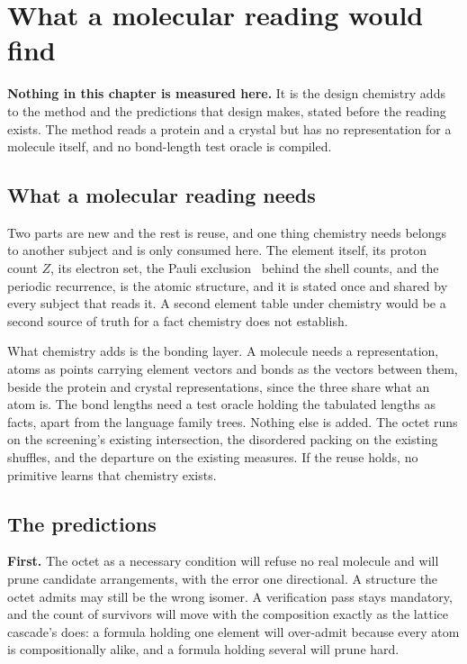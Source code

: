 \chapter{What a molecular reading would find}

\textbf{Nothing in this chapter is measured here.} It is the design chemistry adds to the method and
the predictions that design makes, stated before the reading exists. The method reads a protein and
a crystal but has no representation for a molecule itself, and no bond-length test oracle is
compiled.

\section{What a molecular reading needs}

Two parts are new and the rest is reuse, and one thing chemistry needs belongs to another subject and
is only consumed here. The element itself, its proton count \(Z\), its electron set, the Pauli
exclusion~\cite{src:Pauli-1925} behind the shell counts, and the periodic recurrence, is the atomic
structure, and it is stated once and shared by every subject that reads it. A second element table
under chemistry would be a second source of truth for a fact chemistry does not establish.

What chemistry adds is the bonding layer. A molecule needs a representation, atoms as points carrying
element vectors and bonds as the vectors between them, beside the protein and crystal
representations, since the three share what an atom is. The bond lengths need a test oracle holding
the tabulated lengths as facts, apart from the language family trees. Nothing else is added. The
octet runs on the screening's existing intersection, the disordered packing on the existing
shuffles, and the departure on the existing measures. If the reuse holds, no primitive learns that
chemistry exists.

\section{The predictions}

\textbf{First.} The octet as a necessary condition will refuse no real molecule and will prune
candidate arrangements, with the error one directional. A structure the octet admits may still be the
wrong isomer. A verification pass stays mandatory, and the count of survivors will move with the
composition exactly as the lattice cascade's does: a formula holding one element will over-admit
because every atom is compositionally alike, and a formula holding several will prune hard.

